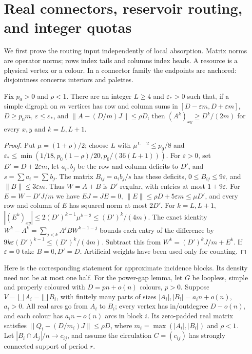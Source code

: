 \section{Real connectors, reservoir routing, and integer quotas}
\label{cyc:section}\label{period:router-section}
We first prove the routing input independently of local absorption. Matrix
norms are operator norms; rows index tails and columns index heads. A
resource is a physical vertex or a colour. In a connector family the
endpoints are anchored: disjointness concerns interiors and palettes.

\begin{lemma}\label{rt:lem:walks}
Fix $p_0>0$ and $\rho<1$. There are an integer $L\ge4$ and $\varepsilon_*>0$ such that, if a simple digraph on $m$ vertices has row and column sums in $[D-\varepsilon{}m,D+\varepsilon{}m]$, $D\ge{}p_0m$, $\varepsilon\le\varepsilon_*$, and $\|A-(D/m)J\|\le\rho{}D$, then $(A^k)_{xy}\ge{}D^k/(2m)$ for every $x,y$ and $k=L,L+1$.
\end{lemma}
\begin{proof}
Put $\mu=(1+\rho)/2$; choose $L$ with $\mu^{L-2}\le{}p_0/8$ and $\varepsilon_*\le\min(1/18,p_0(1-\rho)/20,p_0/(36(L+1)))$. For $\varepsilon>0$, set $D'=D+2\varepsilon{}m$, let $a_i,b_j$ be the row and column deficits to $D'$, and $s=\sum{}a_i=\sum{}b_j$. The matrix $B_{ij}=a_ib_j/s$ has these deficits, $0\le{}B_{ij}\le9\varepsilon$, and $\|B\|\le3\varepsilon{}m$. Thus $W=A+B$ is $D'$-regular, with entries at most $1+9\varepsilon$. For $E=W-D'J/m$ we have $EJ=JE=0$, $\|E\|\le\rho{}D+5\varepsilon{}m\le\mu{}D'$, and every row and column of $E$ has squared norm at most $2D'$. For $k=L,L+1$, $|(E^k)_{xy}|\le2(D')^{k-1}\mu^{k-2}\le(D')^k/(4m)$. The exact identity $W^k-A^k=\sum_{j<k}A^jBW^{k-1-j}$ bounds each entry of the difference by $9k\varepsilon(D')^{k-1}\le(D')^k/(4m)$. Subtract this from $W^k=(D')^kJ/m+E^k$. If $\varepsilon=0$ take $B=0,D'=D$. Artificial weights have been used only for counting.
\end{proof}

Here is the corresponding statement for approximate incidence blocks.
Its density need not be at most one half.
For the power-gap lemma, let $G$ be loopless, simple and properly coloured with $D=pn+o(n)$ colours, $p>0$. Suppose $V=\bigsqcup{}A_i=\bigsqcup{}B_i$, with finitely many parts of sizes $|A_i|,|B_i|=a_in+o(n)$, $a_i>0$. All real arcs go from $A_i$ to $B_i$; every vertex has in/outdegree $D-o(n)$, and each colour has $a_in-o(n)$ arcs in block $i$. Its zero-padded real matrix satisfies $\|Q_i-(D/m_i)J\|\le\rho{}D$, where $m_i=\max(|A_i|,|B_i|)$ and $\rho<1$. Let $|B_i\cap{}A_j|/n\to{}c_{ij}$, and assume the circulation $C=(c_{ij})$ has strongly connected support of period $r$.

